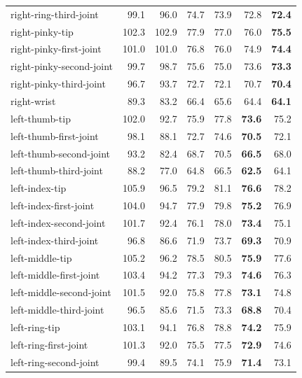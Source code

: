 \begin{longtable}{lrrrrrr}
right-ring-third-joint & 99.1 & 96.0 & 74.7 & 73.9 & 72.8 & \textbf{72.4} \\ %
right-pinky-tip & 102.3 & 102.9 & 77.9 & 77.0 & 76.0 & \textbf{75.5} \\ %
right-pinky-first-joint & 101.0 & 101.0 & 76.8 & 76.0 & 74.9 & \textbf{74.4} \\ %
right-pinky-second-joint & 99.7 & 98.7 & 75.6 & 75.0 & 73.6 & \textbf{73.3} \\ %
right-pinky-third-joint & 96.7 & 93.7 & 72.7 & 72.1 & 70.7 & \textbf{70.4} \\ %
right-wrist & 89.3 & 83.2 & 66.4 & 65.6 & 64.4 & \textbf{64.1} \\ %
left-thumb-tip & 102.0 & 92.7 & 75.9 & 77.8 & \textbf{73.6} & 75.2 \\ %
left-thumb-first-joint & 98.1 & 88.1 & 72.7 & 74.6 & \textbf{70.5} & 72.1 \\ %
left-thumb-second-joint & 93.2 & 82.4 & 68.7 & 70.5 & \textbf{66.5} & 68.0 \\ %
left-thumb-third-joint & 88.2 & 77.0 & 64.8 & 66.5 & \textbf{62.5} & 64.1 \\ %
left-index-tip & 105.9 & 96.5 & 79.2 & 81.1 & \textbf{76.6} & 78.2 \\ %
left-index-first-joint & 104.0 & 94.7 & 77.9 & 79.8 & \textbf{75.2} & 76.9 \\ %
left-index-second-joint & 101.7 & 92.4 & 76.1 & 78.0 & \textbf{73.4} & 75.1 \\ %
left-index-third-joint & 96.8 & 86.6 & 71.9 & 73.7 & \textbf{69.3} & 70.9 \\ %
left-middle-tip & 105.2 & 96.2 & 78.5 & 80.5 & \textbf{75.9} & 77.6 \\ %
left-middle-first-joint & 103.4 & 94.2 & 77.3 & 79.3 & \textbf{74.6} & 76.3 \\ %
left-middle-second-joint & 101.5 & 92.0 & 75.8 & 77.8 & \textbf{73.1} & 74.8 \\ %
left-middle-third-joint & 96.5 & 85.6 & 71.5 & 73.3 & \textbf{68.8} & 70.4 \\ %
left-ring-tip & 103.1 & 94.1 & 76.8 & 78.8 & \textbf{74.2} & 75.9 \\ %
left-ring-first-joint & 101.3 & 92.0 & 75.5 & 77.5 & \textbf{72.9} & 74.6 \\ %
left-ring-second-joint & 99.4 & 89.5 & 74.1 & 75.9 & \textbf{71.4} & 73.1 \\ %

\end{longtable}
